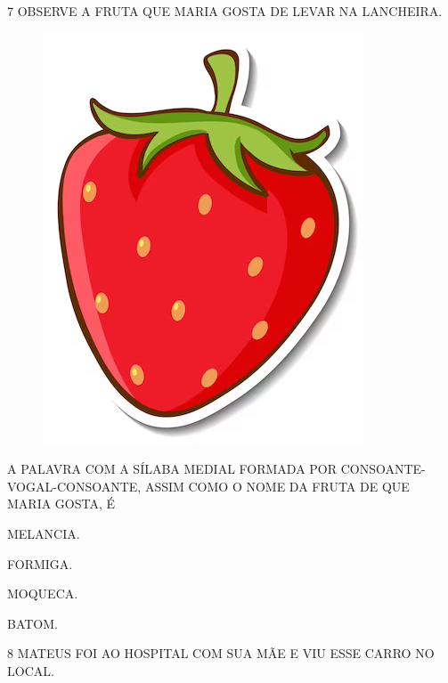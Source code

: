 \num{7} OBSERVE A FRUTA QUE MARIA GOSTA DE LEVAR NA LANCHEIRA.

\begin{figure}[H]
\centering
\includegraphics[width=.5\textwidth]{./media/image74.png}
\end{figure}

A PALAVRA COM A SÍLABA MEDIAL FORMADA POR CONSOANTE-VOGAL-CONSOANTE, ASSIM COMO O NOME DA FRUTA DE QUE MARIA GOSTA, É 

\begin{escolha}

\item MELANCIA.

\item FORMIGA.

\item MOQUECA.

\item BATOM.

\end{escolha}

\num{8} MATEUS FOI AO HOSPITAL COM SUA MÃE E VIU ESSE CARRO NO LOCAL.

